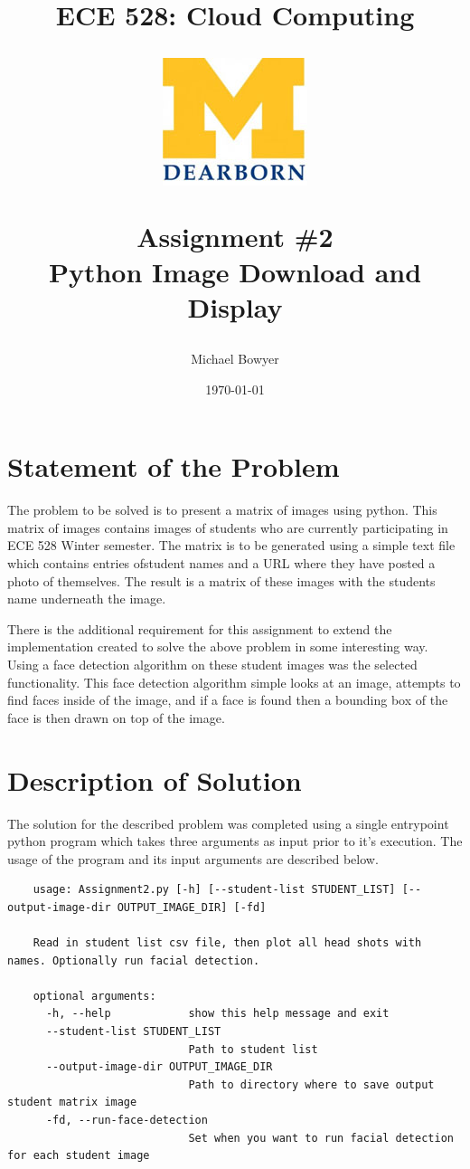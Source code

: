 \documentclass[12pt, letterpaper, final, onecolumn, titlepage] {article}
\title{ECE 528: Cloud Computing \\
	\vspace{1.5cm}
   		\begin{center}\includegraphics{umlogo} \end{center}
	\vspace{1.5cm}
	\textbf{Assignment \#2} \\
Python Image Download and Display}
\author{Michael Bowyer}
\date{\today}
\begin{document}
\maketitle

\doublespacing

\section{Statement of the Problem}

The problem to be solved is to present a matrix of images using python. This matrix of images contains images of students who are currently participating in ECE 528 Winter semester. The matrix is to be generated using a simple text file which contains entries ofstudent names and a URL where they have posted a photo of themselves. The result is a matrix of these images with the students name underneath the image.

There is the additional requirement for this assignment to extend the implementation created to solve the above problem in some interesting way. Using a face detection algorithm on these student images was the selected functionality. This face detection algorithm simple looks at an image, attempts to find faces inside of the image, and if a face is found then a bounding box of the face is then drawn on top of the image.

\pagebreak
\section{Description of Solution}

The solution for the described problem was completed using a single entrypoint python program which takes three arguments as input prior to it's execution. The usage of the program and its input arguments are described below.

\singlespacing
\begin{lstlisting}
	usage: Assignment2.py [-h] [--student-list STUDENT_LIST] [--output-image-dir OUTPUT_IMAGE_DIR] [-fd]

	Read in student list csv file, then plot all head shots with names. Optionally run facial detection.
	
	optional arguments:
	  -h, --help            show this help message and exit
	  --student-list STUDENT_LIST
							Path to student list
	  --output-image-dir OUTPUT_IMAGE_DIR
							Path to directory where to save output student matrix image
	  -fd, --run-face-detection
							Set when you want to run facial detection for each student image
\end{lstlisting}
\doublespacing
\end{document}
